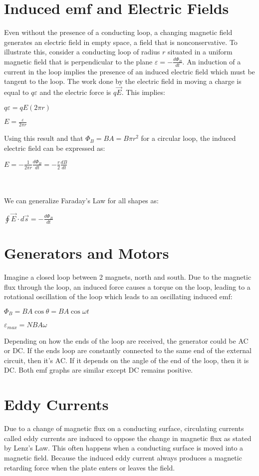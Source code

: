 \documentclass[12pt]{report}
\begin{document}
	\section{Induced emf and Electric Fields}
		Even without the presence of a conducting loop, a changing magnetic field generates an electric field in empty space, a field that is nonconservative. To illustrate this, consider a conducting loop of radius $r$ situated in a uniform magnetic field that is perpendicular to the plane $\varepsilon = -\frac{d\Phi_B}{dt}$. An induction of a current in the loop implies the presence of an induced electric field which must be tangent to the loop. The work done by the electric field in moving a charge is equal to $q\varepsilon$ and the electric force is $q\vec{E}$. This implies:\\
		\centerline{$q\varepsilon = qE(2\pi r)$}
		\centerline{$E = \frac{\varepsilon}{2\pi r}$}
		Using this result and that $\Phi_B = BA = B\pi r^2$ for a circular loop, the induced electric field can be expressed as:\\
		\centerline{$E = -\frac{1}{2\pi r} \frac{d\Phi_B}{dt} = - \frac{r}{2} \frac{dB}{dt}$}
		\\
		\\
		We can generalize Faraday's Law for all shapes as:\\
		\centerline{$\oint \vec{E} \cdot d\vec{s} = - \frac{d\Phi_B}{dt}$}
	\section{Generators and Motors}
		Imagine a closed loop between 2 magnets, north and south. Due to the magnetic flux through the loop, an induced force causes a torque on the loop, leading to a rotational oscillation of the loop which leads to an oscillating induced emf:\\
		\centerline{$\Phi_B = BA \cos \theta = BA\cos \omega t$}
		\centerline{$\varepsilon_{max} = NBA\omega$}
		Depending on how the ends of the loop are received, the generator could be AC or DC. If the ends loop are constantly connected to the same end of the external circuit, then it's AC. If it depends on the angle of the end of the loop, then it is DC. Both emf graphs are similar except DC remains positive.
	\section{Eddy Currents}
		Due to a change of magnetic flux on a conducting surface, circulating currents called eddy currents are induced to oppose the change in magnetic flux as stated by Lenz's Law. This often happens when a conducting surface is moved into a magnetic field. Because the induced eddy current always produces a magnetic retarding force when the plate enters or leaves the field.
\end{document}
